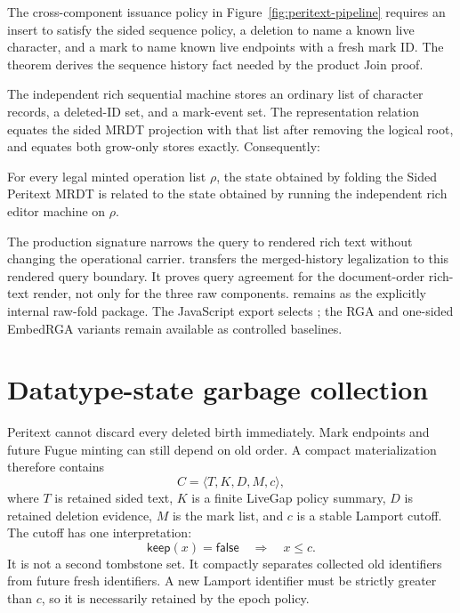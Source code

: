 The cross-component issuance policy in Figure~\ref{fig:peritext-pipeline}
requires an insert to satisfy the sided sequence policy, a deletion to name a known live
character, and a mark to name known live endpoints with a fresh mark ID. The
theorem  derives the sequence history fact needed by
the product Join proof.

The independent rich sequential machine stores an ordinary list of character
records, a deleted-ID set, and a mark-event set. The representation relation
equates the sided MRDT projection with that list after removing the logical
root, and equates both grow-only stores exactly. Consequently:

\begin{theorem}
For every legal minted operation list $\rho$, the state obtained by folding
the Sided Peritext MRDT is related to the state obtained by running the
independent rich editor machine on $\rho$.
\hfill{}
\end{theorem}

The production signature narrows the query to rendered rich text without
changing the operational carrier.  transfers the
merged-history legalization to this rendered query boundary. It proves query
agreement for the document-order rich-text render, not only for the three raw
components.  remains as the explicitly internal
raw-fold package.
The JavaScript export  selects
; the RGA and one-sided EmbedRGA variants remain
available as controlled baselines.

\section{Datatype-state garbage collection}

Peritext cannot discard every deleted birth immediately. Mark endpoints and
future Fugue minting can still depend on old order. A compact materialization
therefore contains
\[
 C=\langle T,K,D,M,c\rangle,
\]
where $T$ is retained sided text, $K$ is a finite LiveGap policy summary,
$D$ is retained deletion evidence, $M$ is the mark list, and $c$ is a stable
Lamport cutoff. The cutoff has one interpretation:
\[
  \mathsf{keep}(x)=\mathsf{false}\quad\Longrightarrow\quad x\le c.
\]
It is not a second tombstone set. It compactly separates collected old
identifiers from future fresh identifiers. A new Lamport identifier must be
strictly greater than $c$, so it is necessarily retained by the epoch policy.

